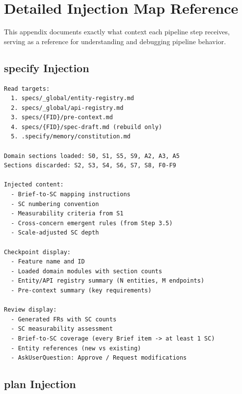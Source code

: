 \documentclass[11pt,a4paper,openright,twoside]{report}
\begin{document}
\chapter{Detailed Injection Map Reference}
\label{app:injection-detail}

This appendix documents exactly what context each pipeline step receives, serving as a reference for understanding and debugging pipeline behavior.

\section{specify Injection}

\begin{lstlisting}[title={specify Context Assembly}]
Read targets:
  1. specs/_global/entity-registry.md
  2. specs/_global/api-registry.md
  3. specs/{FID}/pre-context.md
  4. specs/{FID}/spec-draft.md (rebuild only)
  5. .specify/memory/constitution.md

Domain sections loaded: S0, S1, S5, S9, A2, A3, A5
Sections discarded: S2, S3, S4, S6, S7, S8, F0-F9

Injected content:
  - Brief-to-SC mapping instructions
  - SC numbering convention
  - Measurability criteria from S1
  - Cross-concern emergent rules (from Step 3.5)
  - Scale-adjusted SC depth

Checkpoint display:
  - Feature name and ID
  - Loaded domain modules with section counts
  - Entity/API registry summary (N entities, M endpoints)
  - Pre-context summary (key requirements)

Review display:
  - Generated FRs with SC counts
  - SC measurability assessment
  - Brief-to-SC coverage (every Brief item -> at least 1 SC)
  - Entity references (new vs existing)
  - AskUserQuestion: Approve / Request modifications
\end{lstlisting}

\section{plan Injection}
\end{document}
